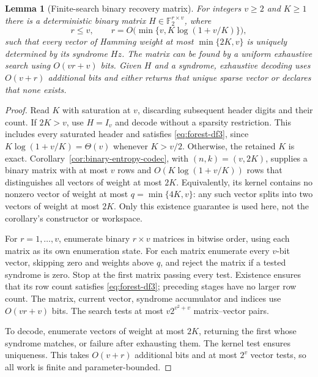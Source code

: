 \documentclass[11pt,letterpaper]{article}
\newtheorem{lemma}[theorem]{Lemma}
\numberwithin{equation}{section}
\begin{document}
\begin{lemma}[Finite-search binary recovery matrix]
\label{lem:dense-binary-code}
For integers $v\ge2$ and $K\ge1$ there is a deterministic binary matrix $H\in\mathbb F_2^{r\times v}$, where
\begin{equation}
r\le v,\qquad
 r=O\bigl(\min\{v,K\log(1+v/K)\}\bigr),             \label{eq:forest-df3}
\end{equation}
such that every vector of Hamming weight at most $\min\{2K,v\}$ is uniquely determined by its syndrome $Hz$.
The matrix can be found by a uniform exhaustive search using $O(vr+v)$ bits.
Given $H$ and a syndrome, exhaustive decoding uses $O(v+r)$ additional bits and either returns that unique sparse vector or declares that none exists.
\end{lemma}
\begin{proof}
Read $K$ with saturation at $v$, discarding subsequent header digits and their count.
If $2K>v$, use $H=I_v$ and decode without a sparsity restriction.
This includes every saturated header and satisfies \eqref{eq:forest-df3}, since $K\log(1+v/K)=\Theta(v)$ whenever $K>v/2$.
Otherwise, the retained $K$ is exact.
Corollary~\ref{cor:binary-entropy-codec}, with $(n,k)=(v,2K)$, supplies a binary matrix with at most $v$ rows and $O(K\log(1+v/K))$ rows that distinguishes all vectors of weight at most $2K$.
Equivalently, its kernel contains no nonzero vector of weight at most $q=\min\{4K,v\}$: any such vector splits into two vectors of weight at most $2K$.
Only this existence guarantee is used here, not the corollary's constructor or workspace.

For $r=1,\ldots,v$, enumerate binary $r\times v$ matrices in bitwise order, using each matrix as its own enumeration state.
For each matrix enumerate every $v$-bit vector, skipping zero and weights above $q$, and reject the matrix if a tested syndrome is zero.
Stop at the first matrix passing every test.
Existence ensures that its row count satisfies \eqref{eq:forest-df3}; preceding stages have no larger row count.
The matrix, current vector, syndrome accumulator and indices use $O(vr+v)$ bits.
The search tests at most $v2^{v^2+v}$ matrix--vector pairs.

To decode, enumerate vectors of weight at most $2K$, returning the first whose syndrome matches, or failure after exhausting them.
The kernel test ensures uniqueness.
This takes $O(v+r)$ additional bits and at most $2^v$ vector tests, so all work is finite and parameter-bounded.

\end{proof}
\end{document}
